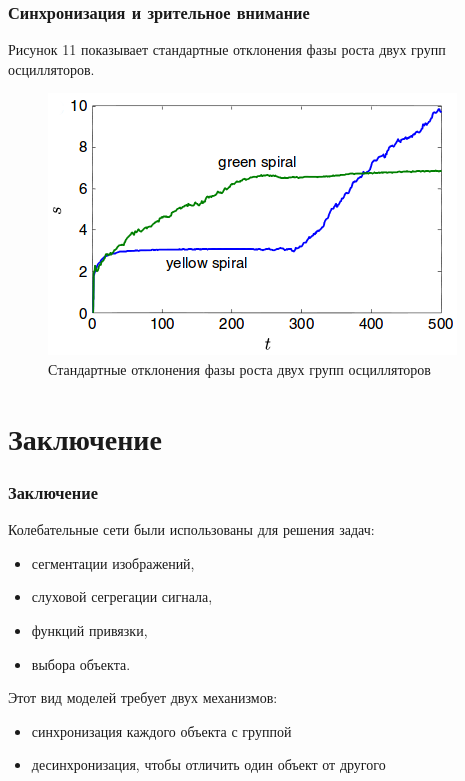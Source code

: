 \documentclass{beamer}
\begin{document}

\begin{frame}
\frametitle{Синхронизация и зрительное внимание}

Рисунок 11 показывает стандартные отклонения фазы роста двух групп осцилляторов.

\begin{figure}
\includegraphics[scale=0.35]{img/11}
\caption{Стандартные отклонения фазы роста двух групп осцилляторов}
\end{figure}

\end{frame}

\section{Заключение}

\begin{frame}
\frametitle{Заключение}

Колебательные сети были использованы для решения задач:
\begin{itemize}
\item сегментации изображений,
\item слуховой сегрегации сигнала,
\item функций привязки,
\item выбора объекта.
\end{itemize}
\medskip

Этот вид моделей требует двух механизмов:
\begin{itemize}
\item синхронизация каждого объекта с группой  
\item десинхронизация, чтобы отличить один объект от другого
\end{itemize}
\end{frame}
\end{document}
